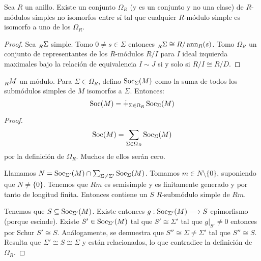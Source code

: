 
\begin{lema}
  Sea \(R\) un anillo. Existe un conjunto \(\Omega_R\) (y es un conjunto
  y no una clase) de \(R\)-módulos simples no isomorfos entre sí tal que
  cualquier \(R\)-módulo simple es isomorfo a uno de los \(\Omega_R\).
\end{lema}
\begin{proof}
  Sea \(\prescript{}{R}{\Sigma}\) simple. Tomo
  \(0\neq s\in\Sigma\) entonces \(\prescript{}{R}{\Sigma}\cong
  R/\operatorname{ann}_R(s)\). Tomo \(\Omega_R\) un conjunto de representantes de los
  \(R\)-módulos \(R/I\) para \(I\) ideal izquierda maximales bajo
  la relación de equivalencia \(I\sim J\) si y solo si
  \(R/I\cong R/D\).

\end{proof}

\begin{prop}
  \(\prescript{}{R}{M}\) un módulo. Para \(\Sigma\in\Omega_R\), defino
  \(\operatorname{Soc}_\Sigma(M)\) como la suma de todos los submódulos simples de \(M\)
  isomorfos a \(\Sigma\). Entonces:
  \[
    \operatorname{Soc}(M)=\dot{+}_{\Sigma\in\Omega_R}\operatorname{Soc}_\Sigma(M)
  \]
\end{prop}
\begin{proof}
  \[
    \operatorname{Soc}(M)=\sum_{\Sigma\in\Omega_R}\operatorname{Soc}_\Sigma(M)
  \]
  por la definición de \(\Omega_R\). Muchos de ellos serán cero.

  Llamamos \(N=\operatorname{Soc}_{\Sigma'}(M)\cap\sum_{\Sigma\neq\Sigma'}\operatorname{Soc}_\Sigma(M)\).
  Tomamos \(m\in N\setminus\{0\}\), suponiendo que \(N\neq \{0\}\). Tenemos
  que \(Rm\) es semisimple y es finitamente generado y por tanto de longitud
  finita. Entonces contiene un \(S\) \(R\)-submódulo simple de \(Rm\).

  Tenemos que \(S\subseteq\operatorname{Soc}_{\Sigma'}(M)\). Existe entonces
  \(g:\operatorname{Soc}_{\Sigma'}(M)\longrightarrow S\) epimorfismo (porque escinde).
  Existe \(S'\in\operatorname{Soc}_{\Sigma'}(M)\) tal que \(S'\cong \Sigma'\) tal que
  \(g|_{S'}\neq0\) entonces por Schur \(S'\cong S\). Análogamente,
  se demuestra que \(S''\cong\Sigma\neq\Sigma'\) tal que \(S''\cong S\).
  Resulta que \(\Sigma'\cong S\cong\Sigma\) y están relacionados, lo que
  contradice la definición de \(\Omega_R\).

\end{proof}
